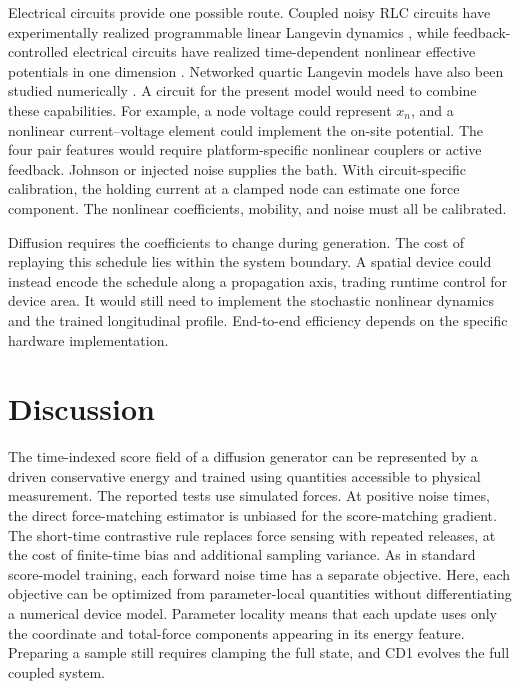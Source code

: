 \documentclass[referee,lineno,pdflatex,sn-nature]{sn-jnl}
\begin{document}
Electrical circuits provide one possible route. Coupled noisy RLC circuits have
experimentally realized programmable linear Langevin dynamics
\cite{melanson2025thermodynamic}, while feedback-controlled electrical circuits have
realized time-dependent nonlinear effective potentials in one dimension
\cite{chang2021generation}. Networked quartic Langevin models have also been studied
numerically \cite{whitelam2026nonlinear}. A circuit for the present model would need
to combine these capabilities. For example, a node voltage could represent $x_n$,
and a nonlinear current--voltage element could implement the on-site potential. The
four pair features would require platform-specific nonlinear couplers or active
feedback.
Johnson or injected noise supplies the bath. With circuit-specific calibration, the
holding current at a clamped node can estimate one force component. The nonlinear
coefficients, mobility, and noise must all be calibrated.

Diffusion requires the coefficients to change during generation. The cost of
replaying this schedule lies within the system boundary. A spatial device could
instead encode the schedule along a propagation
axis, trading runtime control for device area. It would still need to implement
the stochastic nonlinear dynamics and the trained longitudinal profile. End-to-end
efficiency depends on the specific hardware implementation.

\section{Discussion}\label{sec:discussion}

The time-indexed score field of a diffusion generator can be represented by a driven
conservative energy and trained using quantities accessible to physical measurement.
The reported tests use simulated forces. At positive noise times, the direct
force-matching estimator is unbiased for the score-matching gradient. The
short-time contrastive rule
replaces force sensing with repeated releases, at the cost of finite-time bias and
additional sampling variance. As in standard score-model training, each forward
noise time has a separate objective. Here, each objective can be optimized from
parameter-local quantities without differentiating a numerical device model.
Parameter locality means that each update uses only the coordinate and total-force
components appearing in its energy feature. Preparing a sample still requires
clamping the full state, and CD1 evolves the full coupled system.
\end{document}
